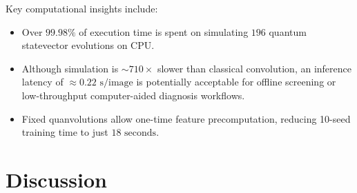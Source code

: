 \documentclass[runningheads]{llncs}
\begin{document}
\begin{table}[t]
\caption{Inference latency and computational cost on Intel CPU.}
\label{tab:latency}
\centering
\small
{}
\end{table}

Key computational insights include:
\begin{itemize}
    \item Over $99.98\%$ of execution time is spent on simulating $196$ quantum statevector evolutions on CPU.
    \item Although simulation is $\sim 710\times$ slower than classical convolution, an inference latency of $\approx 0.22\text{ s/image}$ is potentially acceptable for offline screening or low-throughput computer-aided diagnosis workflows.
    \item Fixed quanvolutions allow one-time feature precomputation, reducing 10-seed training time to just $18\text{ seconds}$.
\end{itemize}

\section{Discussion}
\end{document}
